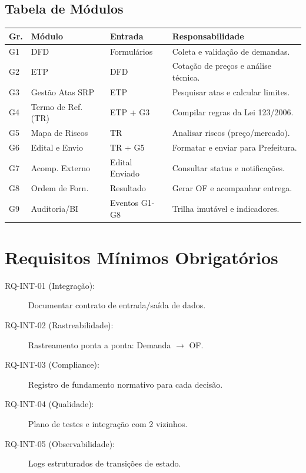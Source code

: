 \documentclass[a4paper,12pt]{article}
\begin{document}
\subsection{Tabela de Módulos}
\begin{small}
\begin{longtable}{lp{3.5cm}p{2.5cm}p{4.5cm}}
\toprule
\textbf{Gr.} & \textbf{Módulo} & \textbf{Entrada} & \textbf{Responsabilidade} \\ \midrule
G1 & DFD & Formulários & Coleta e validação de demandas. \\ \midrule
G2 & ETP & DFD & Cotação de preços e análise técnica. \\ \midrule
G3 & Gestão Atas SRP & ETP & Pesquisar atas e calcular limites. \\ \midrule
G4 & Termo de Ref. (TR) & ETP + G3 & Compilar regras da Lei 123/2006. \\ \midrule
G5 & Mapa de Riscos & TR & Analisar riscos (preço/mercado). \\ \midrule
G6 & Edital e Envio & TR + G5 & Formatar e enviar para Prefeitura. \\ \midrule
G7 & Acomp. Externo & Edital Enviado & Consultar status e notificações. \\ \midrule
G8 & Ordem de Forn. & Resultado & Gerar OF e acompanhar entrega. \\ \midrule
G9 & Auditoria/BI & Eventos G1-G8 & Trilha imutável e indicadores. \\ \bottomrule
\end{longtable}
\end{small}

\section{Requisitos Mínimos Obrigatórios}
\begin{description}
    \item[RQ-INT-01 (Integração):] Documentar contrato de entrada/saída de dados.
    \item[RQ-INT-02 (Rastreabilidade):] Rastreamento ponta a ponta: Demanda $\rightarrow$ OF.
    \item[RQ-INT-03 (Compliance):] Registro de fundamento normativo para cada decisão.
    \item[RQ-INT-04 (Qualidade):] Plano de testes e integração com 2 vizinhos.
    \item[RQ-INT-05 (Observabilidade):] Logs estruturados de transições de estado.
\end{description}
\end{document}
